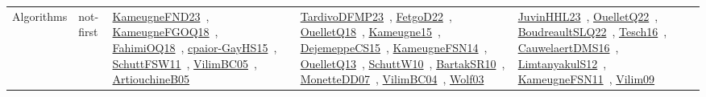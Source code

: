 {\begin{longtable}{lp{3cm}>{\raggedright\arraybackslash}p{6cm}>{\raggedright\arraybackslash}p{6cm}>{\raggedright\arraybackslash}p{8cm}}
Algorithms & not-first & \href{papers/KameugneFND23.pdf}{KameugneFND23}~\cite{KameugneFND23}, \href{papers/KameugneFGOQ18.pdf}{KameugneFGOQ18}~\cite{KameugneFGOQ18}, \href{articles/FahimiOQ18.pdf}{FahimiOQ18}~\cite{FahimiOQ18}, \href{papers/cpaior-GayHS15.pdf}{cpaior-GayHS15}~\cite{cpaior-GayHS15}, \href{articles/SchuttFSW11.pdf}{SchuttFSW11}~\cite{SchuttFSW11}, \href{articles/VilimBC05.pdf}{VilimBC05}~\cite{VilimBC05}, \href{papers/ArtiouchineB05.pdf}{ArtiouchineB05}~\cite{ArtiouchineB05} & \href{papers/TardivoDFMP23.pdf}{TardivoDFMP23}~\cite{TardivoDFMP23}, \href{articles/FetgoD22.pdf}{FetgoD22}~\cite{FetgoD22}, \href{papers/OuelletQ18.pdf}{OuelletQ18}~\cite{OuelletQ18}, \href{articles/Kameugne15.pdf}{Kameugne15}~\cite{Kameugne15}, \href{papers/DejemeppeCS15.pdf}{DejemeppeCS15}~\cite{DejemeppeCS15}, \href{articles/KameugneFSN14.pdf}{KameugneFSN14}~\cite{KameugneFSN14}, \href{papers/OuelletQ13.pdf}{OuelletQ13}~\cite{OuelletQ13}, \href{papers/SchuttW10.pdf}{SchuttW10}~\cite{SchuttW10}, \href{articles/BartakSR10.pdf}{BartakSR10}~\cite{BartakSR10}, \href{papers/MonetteDD07.pdf}{MonetteDD07}~\cite{MonetteDD07}, \href{papers/VilimBC04.pdf}{VilimBC04}~\cite{VilimBC04}, \href{papers/Wolf03.pdf}{Wolf03}~\cite{Wolf03} & \href{papers/JuvinHHL23.pdf}{JuvinHHL23}~\cite{JuvinHHL23}, \href{papers/OuelletQ22.pdf}{OuelletQ22}~\cite{OuelletQ22}, \href{papers/BoudreaultSLQ22.pdf}{BoudreaultSLQ22}~\cite{BoudreaultSLQ22}, \href{papers/Tesch16.pdf}{Tesch16}~\cite{Tesch16}, \href{papers/CauwelaertDMS16.pdf}{CauwelaertDMS16}~\cite{CauwelaertDMS16}, \href{articles/LimtanyakulS12.pdf}{LimtanyakulS12}~\cite{LimtanyakulS12}, \href{papers/KameugneFSN11.pdf}{KameugneFSN11}~\cite{KameugneFSN11}, \href{papers/Vilim09.pdf}{Vilim09}~\cite{Vilim09}\\

\end{longtable}}
